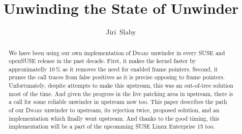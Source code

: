 \documentclass[10pt]{llncs}
\newcommand{\dwarf}{\textsc{Dwarf}\xspace}
\begin{document}
\title{Unwinding the State of Unwinder}
\author{Jiri~Slaby}

\maketitle

\begin{abstract}
  We have been using our own implementation of \dwarf unwinder in every SUSE
  and openSUSE release in the past decade. First, it makes the kernel faster
  by approximatelly 10\,\% as it removes the need for enabled frame pointers.
  Second, it prunes the call traces from false positives as it is precise
  opposing to frame pointers. Unfortunately, despite attempts to make this
  upstream, this was an out-of-tree solution most of the time.  And given the
  progress in the live patching area in upstream, there is a call for some
  reliable unwinder in upstream now too.  This paper describes the path of our
  \dwarf unwinder to upstream, its rejection twice, proposed solution, and
  an implementation which finally went upstream. And thanks to the good
  timing, this implementation will be a part of the upcomming SUSE Linux
  Enterprise 15 too.
\end{abstract}
\end{document}
